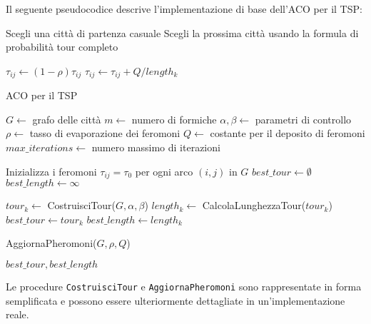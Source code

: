 Il seguente pseudocodice descrive l'implementazione di base dell'\Gls{ACO} per il \Gls{TSP}:

\begin{algorithm}
	\begin{algorithmic}[1]
		\State Scegli una città di partenza casuale
		\State Scegli la prossima città usando la formula di probabilità
		\EndWhile
		\State \Return tour completo
		\EndProcedure

		\State $\tau_{ij} \gets (1-\rho)\tau_{ij}$
		\State $\tau_{ij} \gets \tau_{ij} + Q/length_k$
		\EndIf
		\EndFor
		\EndFor
		\EndProcedure
	\end{algorithmic}
\end{algorithm}

\begin{algorithm}
	\caption{\Gls{ACO} per il \Gls{TSP}}\label{alg:aco-tsp}
	\begin{algorithmic}[1]
		\State $G \gets$ grafo delle città
		\State $m \gets$ numero di formiche
		\State $\alpha, \beta \gets$ parametri di controllo
		\State $\rho \gets$ tasso di evaporazione dei feromoni
		\State $Q \gets$ costante per il deposito di feromoni
		\State $max\_iterations \gets$ numero massimo di iterazioni

		\State Inizializza i feromoni $\tau_{ij} = \tau_0$ per ogni arco $(i,j)$ in $G$
		\State $best\_tour \gets \emptyset$
		\State $best\_length \gets \infty$

		\State $tour_k \gets$ CostruisciTour($G, \alpha, \beta$)
		\State $length_k \gets$ CalcolaLunghezzaTour($tour_k$)
		\State $best\_tour \gets tour_k$
		\State $best\_length \gets length_k$
		\EndIf
		\EndFor

		\State AggiornaPheromoni($G, \rho, Q$)
		\EndFor

		\State \Return $best\_tour, best\_length$
		\EndProcedure

	\end{algorithmic}
\end{algorithm}

Le procedure \texttt{CostruisciTour} e \texttt{AggiornaPheromoni} sono rappresentate in forma semplificata e possono essere ulteriormente dettagliate in un'implementazione reale.

